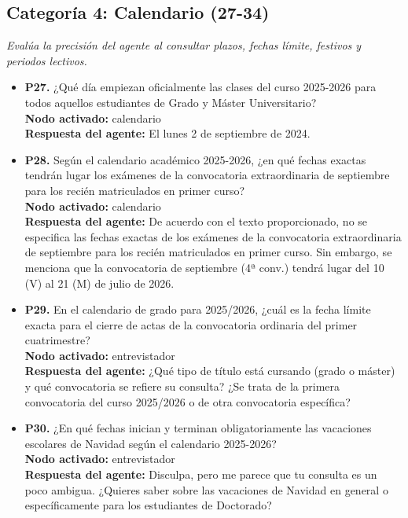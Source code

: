 \documentclass{article}
\begin{document}
\subsection{Categoría 4: Calendario (27-34)}
\textit{Evalúa la precisión del agente al consultar plazos, fechas límite, festivos y periodos lectivos.}
\begin{itemize}
      \item \textbf{P27.} ¿Qué día empiezan oficialmente las clases del curso 2025-2026 para todos aquellos estudiantes de Grado y Máster Universitario? \\
            \textbf{Nodo activado:} calendario \\
            \textbf{Respuesta del agente:} El lunes 2 de septiembre de 2024.

      \item \textbf{P28.} Según el calendario académico 2025-2026, ¿en qué fechas exactas tendrán lugar los exámenes de la convocatoria extraordinaria de septiembre para los recién matriculados en primer curso? \\
            \textbf{Nodo activado:} calendario \\
            \textbf{Respuesta del agente:} De acuerdo con el texto proporcionado, no se especifica las fechas exactas de los exámenes de la convocatoria extraordinaria de septiembre para los recién matriculados en primer curso. Sin embargo, se menciona que la convocatoria de septiembre (4ª conv.) tendrá lugar del 10 (V) al 21 (M) de julio de 2026.

      \item \textbf{P29.} En el calendario de grado para 2025/2026, ¿cuál es la fecha límite exacta para el cierre de actas de la convocatoria ordinaria del primer cuatrimestre? \\
            \textbf{Nodo activado:} entrevistador \\
            \textbf{Respuesta del agente:} ¿Qué tipo de título está cursando (grado o máster) y qué convocatoria se refiere su consulta? ¿Se trata de la primera convocatoria del curso 2025/2026 o de otra convocatoria específica?

      \item \textbf{P30.} ¿En qué fechas inician y terminan obligatoriamente las vacaciones escolares de Navidad según el calendario 2025-2026? \\
            \textbf{Nodo activado:} entrevistador \\
            \textbf{Respuesta del agente:} Disculpa, pero me parece que tu consulta es un poco ambigua. ¿Quieres saber sobre las vacaciones de Navidad en general o específicamente para los estudiantes de Doctorado?


\end{itemize}
\end{document}
